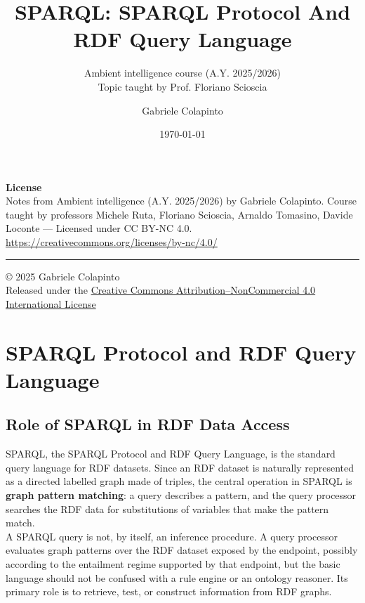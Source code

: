 \documentclass{scrbook}
\title{SPARQL: SPARQL Protocol And RDF Query Language}
\subtitle{Ambient intelligence course (A.Y. 2025/2026)\\Topic taught by Prof. Floriano Scioscia}
\author{Gabriele Colapinto}
\date{\today}
\begin{document}
	
	\maketitle
	\thispagestyle{empty}
	
	{\Large\textbf{License}} \\
	{Notes from Ambient intelligence (A.Y. 2025/2026) by Gabriele Colapinto. 
		Course taught by professors Michele Ruta, Floriano Scioscia, Arnaldo Tomasino, Davide Loconte — 
		Licensed under CC BY-NC 4.0.\\
		\url{https://creativecommons.org/licenses/by-nc/4.0/}}
	
	\vspace*{\fill}
	\rule{\textwidth}{0.2pt}
	\small{© 2025 Gabriele Colapinto \\
		Released under the \href{https://creativecommons.org/licenses/by-nc/4.0/}{Creative Commons Attribution–NonCommercial 4.0 International License}}
	
	\clearpage
	
	\tableofcontents
	
	\chapter{SPARQL Protocol and RDF Query Language}
	
	\section{Role of SPARQL in RDF Data Access}
	
	SPARQL, the SPARQL Protocol and RDF Query Language, is the standard query language for RDF datasets. Since an RDF dataset is naturally represented as a directed labelled graph made of triples, the central operation in SPARQL is \textbf{graph pattern matching}: a query describes a pattern, and the query processor searches the RDF data for substitutions of variables that make the pattern match.\\
	
	A SPARQL query is not, by itself, an inference procedure. A query processor evaluates graph patterns over the RDF dataset exposed by the endpoint, possibly according to the entailment regime supported by that endpoint, but the basic language should not be confused with a rule engine or an ontology reasoner. Its primary role is to retrieve, test, or construct information from RDF graphs.\\
	
\end{document}
